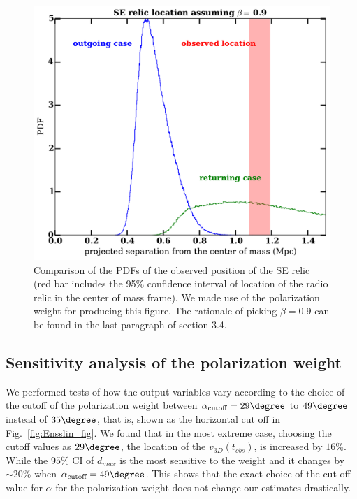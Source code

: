 \documentclass[letterpaper,useAMS,usenatbib]{mn2e}
\begin{document}
\begin{figure}
	\includegraphics[width=\linewidth]{our_guess_SE.pdf}
	\caption{Comparison of the PDFs of the observed position of the SE relic (red bar
	includes the 95\% confidence interval of location of the radio relic in
the center of mass frame). We made use of the polarization weight for
producing this figure. The
rationale of picking $\beta = 0.9$ can be found in the last paragraph of
section 3.4. 
}
	\label{fig:our_guessed_scenario1}
\end{figure}
\subsection{Sensitivity analysis of the polarization weight}
%
\label{sec:sensitivityTests}
We performed tests of how the output variables vary according to the
choice of the cutoff of the polarization weight between
$\alpha_{\text{cutoff}} =
29 \degree$ to $49\degree$ instead of $35 \degree$, that is, shown as the
horizontal cut off in Fig.~\ref{fig:Ensslin_fig}.
We found that in the most extreme case, choosing the cutoff values as $29
\degree$, the location of the $v_{3D}(t_{obs})$, is
increased by $16 \%$. While the $95\%$ CI of $d_{max}$ is
the most sensitive to the weight and it changes by
$\sim20 \%$ when $\alpha_{\text{cutoff}} = 49 \degree$. 
This shows that the exact choice of the cut off value for $\alpha$ for the
polarization weight does not change our estimates drastically.
\end{document}
